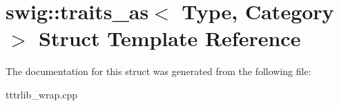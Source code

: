 \hypertarget{structswig_1_1traits__as}{}\section{swig\+:\+:traits\+\_\+as$<$ Type, Category $>$ Struct Template Reference}
\label{structswig_1_1traits__as}


The documentation for this struct was generated from the following file\+:\begin{DoxyCompactItemize}
\item 
tttrlib\+\_\+wrap.\+cpp\end{DoxyCompactItemize}
